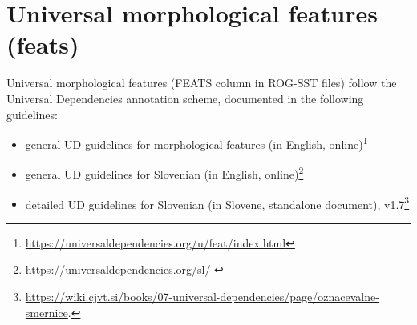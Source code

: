 \documentclass[a4paper,oneside,12pt]{article}
\begin{document}
\section{Universal morphological features (feats)}
Universal morphological features (FEATS column in ROG-SST files) follow the
Universal Dependencies annotation scheme, documented in the following
guidelines:
\begin{itemize}
  \item general UD guidelines for morphological features (in English,
        online)\footnote{\url{https://universaldependencies.org/u/feat/index.html}}
  \item general UD guidelines for Slovenian (in English, online)\footnote{\url{
            https://universaldependencies.org/sl/ }}
  \item detailed UD guidelines for Slovenian (in Slovene, standalone document),
        v1.7\footnote{\url{https://wiki.cjvt.si/books/07-universal-dependencies/page/oznacevalne-smernice}.}
\end{itemize}
\end{document}
